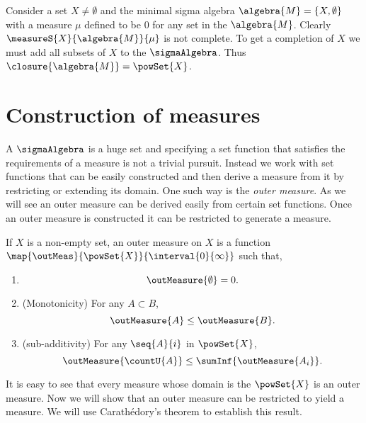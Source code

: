 \begin{Example}
    Consider a set $X \neq \emptyset$ and the minimal sigma 
    algebra $\algebra{M} = \lbrace X,\emptyset\rbrace$ with a measure $\mu$ defined to be $0$ 
    for any set in the $\algebra{M}$. Clearly $\measureS{X}{\algebra{M}}{\mu}$ is not complete. To
    get a completion of $X$ we must add all subsets of $X$ to the $\sigmaAlgebra$. Thus
    $\closure{\algebra{M}} = \powSet{X}$.
\end{Example}
\section{Construction of measures}
A $\sigmaAlgebra$ is a huge set and specifying a set function that satisfies the requirements of a
measure is not a trivial pursuit. Instead we work with set functions that can be easily constructed 
and then derive a measure from it by restricting or extending its domain. One such way is the
\emph{outer measure}. As we will see an outer measure can be derived easily from certain set 
functions. Once an outer measure is constructed it can be restricted to generate a measure.
\begin{Definition}[name=Outer measure]
    If $X$ is a non-empty set, an outer measure on $X$ is a function
    $\map{\outMeas}{\powSet{X}}{\interval{0}{\infty}}$ such that,
    \begin{enumerate}
	\item
	    \[\outMeasure{\emptyset} = 0.\]
	\item
	    (Monotonicity) For any $A \subset B$,
	    \[\outMeasure{A} \leq \outMeasure{B}.\]
	\item
	    (sub-additivity) For any $\seq{A}{i}$ in $\powSet{X}$,
	    \[\outMeasure{\countU{A}} \leq \sumInf{\outMeasure{A_i}}.\]
    \end{enumerate}
\end{Definition}
It is easy to see that every measure whose domain is the $\powSet{X}$ is an outer measure. Now we
will show that an outer measure can be restricted to yield a measure. We will use Carath{\'e}dory's
theorem to establish this result.

